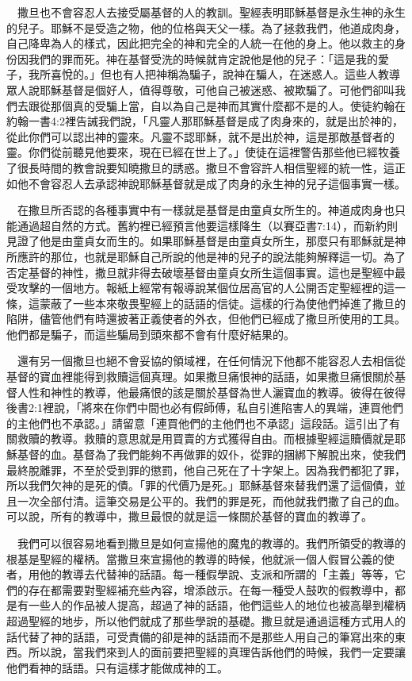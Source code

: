 \documentclass{book}
\begin{document}
　撒旦也不會容忍人去接受屬基督的人的教訓。聖經表明耶穌基督是永生神的永生的兒子。耶穌不是受造之物，他的位格與天父一樣。為了拯救我們，他道成肉身，自己降卑為人的樣式，因此把完全的神和完全的人統一在他的身上。他以救主的身份因我們的罪而死。神在基督受洗的時候就肯定說他是他的兒子：「這是我的愛子，我所喜悅的。」但也有人把神稱為騙子，說神在騙人，在迷惑人。這些人教導眾人說耶穌基督是個好人，值得尊敬，可他自己被迷惑、被欺騙了。可他們卻叫我們去跟從那個真的受騙上當，自以為自己是神而其實什麼都不是的人。使徒約翰在約翰一書4:2裡告誡我們說，「凡靈人那耶穌基督是成了肉身來的，就是出於神的，從此你們可以認出神的靈來。凡靈不認耶穌，就不是出於神，這是那敵基督者的靈。你們從前聽見他要來，現在已經在世上了。」使徒在這裡警告那些他已經牧養了很長時間的教會說要知曉撒旦的誘惑。撒旦不會容許人相信聖經的統一性，這正如他不會容忍人去承認神說耶穌基督就是成了肉身的永生神的兒子這個事實一樣。

　在撒旦所否認的各種事實中有一樣就是基督是由童貞女所生的。神道成肉身也只能通過超自然的方式。舊約裡已經預言他要這樣降生（以賽亞書7:14），而新約則見證了他是由童貞女而生的。如果耶穌基督是由童貞女所生，那麼只有耶穌就是神所應許的那位，也就是耶穌自己所說的他是神的兒子的說法能夠解釋這一切。為了否定基督的神性，撒旦就非得去破壞基督由童貞女所生這個事實。這也是聖經中最受攻擊的一個地方。報紙上經常有報導說某個位居高官的人公開否定聖經裡的這一條，這蒙蔽了一些本來敬畏聖經上的話語的信徒。這樣的行為使他們掉進了撒旦的陷阱，儘管他們有時還披著正義使者的外衣，但他們已經成了撒旦所使用的工具。他們都是騙子，而這些騙局到頭來都不會有什麼好結果的。

　還有另一個撒旦也絕不會妥協的領域裡，在任何情況下他都不能容忍人去相信從基督的寶血裡能得到救贖這個真理。如果撒旦痛恨神的話語，如果撒旦痛恨關於基督人性和神性的教導，他最痛恨的該是關於基督為世人灑寶血的教導。彼得在彼得後書2:1裡說，「將來在你們中間也必有假師傅，私自引進陷害人的異端，連買他們的主他們也不承認。」請留意「連買他們的主他們也不承認」這段話。這引出了有關救贖的教導。救贖的意思就是用買賣的方式獲得自由。而根據聖經這贖價就是耶穌基督的血。基督為了我們能夠不再做罪的奴仆，從罪的捆綁下解脫出來，使我們最終脫離罪，不至於受到罪的懲罰，他自己死在了十字架上。因為我們都犯了罪，所以我們欠神的是死的債。「罪的代價乃是死。」耶穌基督來替我們還了這個債，並且一次全部付清。這筆交易是公平的。我們的罪是死，而他就我們撒了自己的血。可以說，所有的教導中，撒旦最恨的就是這一條關於基督的寶血的教導了。

　我們可以很容易地看到撒旦是如何宣揚他的魔鬼的教導的。我們所領受的教導的根基是聖經的權柄。當撒旦來宣揚他的教導的時候，他就派一個人假冒公義的使者，用他的教導去代替神的話語。每一種假學說、支派和所謂的「主義」等等，它們的存在都需要對聖經補充些內容，增添啟示。在每一種受人鼓吹的假教導中，都是有一些人的作品被人提高，超過了神的話語，他們這些人的地位也被高舉到權柄超過聖經的地步，所以他們就成了那些學說的基礎。撒旦就是通過這種方式用人的話代替了神的話語，可受責備的卻是神的話語而不是那些人用自己的筆寫出來的東西。所以說，當我們來到人的面前要把聖經的真理告訴他們的時候，我們一定要讓他們看神的話語。只有這樣才能做成神的工。
\end{document}
